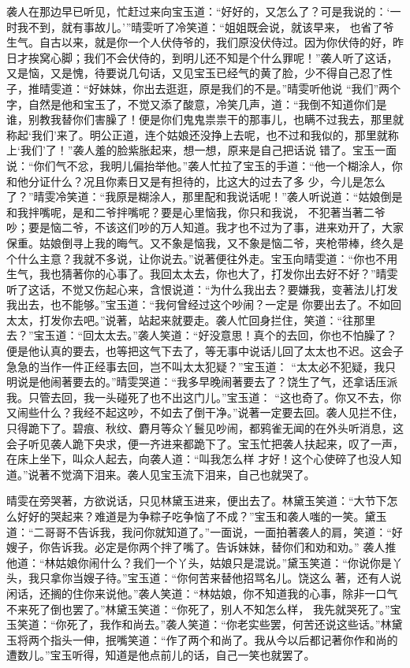 \begin{parag}


    袭人在那边早已听见，忙赶过来向宝玉道：“好好的，又怎么了？可是我说的：‘一时我不到，就有事故儿。’”晴雯听了冷笑道：“姐姐既会说，就该早来， 也省了爷生气。自古以来，就是你一个人伏侍爷的，我们原没伏侍过。因为你伏侍的好，昨日才挨窝心脚；我们不会伏侍的，到明儿还不知是个什么罪呢！”袭人听了这话，又是恼，又是愧，待要说几句话，又见宝玉已经气的黄了脸，少不得自己忍了性子，推晴雯道：“好妹妹，你出去逛逛，原是我们的不是。”晴雯听他说 “我们”两个字，自然是他和宝玉了，不觉又添了酸意，冷笑几声，道：“我倒不知道你们是谁，别教我替你们害臊了！便是你们鬼鬼祟祟干的那事儿，也瞒不过我去，那里就称起‘我们’来了。明公正道，连个姑娘还没挣上去呢，也不过和我似的，那里就称上‘我们’了！”袭人羞的脸紫胀起来，想一想，原来是自己把话说 错了。宝玉一面说：“你们气不忿，我明儿偏抬举他。”袭人忙拉了宝玉的手道：“他一个糊涂人，你和他分证什么？况且你素日又是有担待的，比这大的过去了多 少，今儿是怎么了？”晴雯冷笑道：“我原是糊涂人，那里配和我说话呢！”袭人听说道：“姑娘倒是和我拌嘴呢，是和二爷拌嘴呢？要是心里恼我，你只和我说， 不犯著当著二爷吵；要是恼二爷，不该这们吵的万人知道。我才也不过为了事，进来劝开了，大家保重。姑娘倒寻上我的晦气。又不象是恼我，又不象是恼二爷，夹枪带棒，终久是个什么主意？我就不多说，让你说去。”说著便往外走。宝玉向晴雯道：“你也不用生气，我也猜著你的心事了。我回太太去，你也大了，打发你出去好不好？”晴雯听了这话，不觉又伤起心来，含恨说道：“为什么我出去？要嫌我，变著法儿打发我出去，也不能够。”宝玉道：“我何曾经过这个吵闹？一定是 你要出去了。不如回太太，打发你去吧。”说著，站起来就要走。袭人忙回身拦住，笑道：“往那里去？”宝玉道：“回太太去。”袭人笑道：“好没意思！真个的去回，你也不怕臊了？便是他认真的要去，也等把这气下去了，等无事中说话儿回了太太也不迟。这会子急急的当作一件正经事去回，岂不叫太太犯疑？”宝玉道： “太太必不犯疑，我只明说是他闹著要去的。”晴雯哭道：“我多早晚闹著要去了？饶生了气，还拿话压派我。只管去回，我一头碰死了也不出这门儿。”宝玉道： “这也奇了。你又不去，你又闹些什么？我经不起这吵，不如去了倒干净。”说著一定要去回。袭人见拦不住，只得跪下了。碧痕、秋纹、麝月等众丫鬟见吵闹，都鸦雀无闻的在外头听消息，这会子听见袭人跪下央求，便一齐进来都跪下了。宝玉忙把袭人扶起来，叹了一声，在床上坐下，叫众人起去，向袭人道：“叫我怎么样 才好！这个心使碎了也没人知道。”说著不觉滴下泪来。袭人见宝玉流下泪来，自己也就哭了。
\end{parag}


\begin{parag}


    晴雯在旁哭著，方欲说话，只见林黛玉进来，便出去了。林黛玉笑道：“大节下怎么好好的哭起来？难道是为争粽子吃争恼了不成？”宝玉和袭人嗤的一笑。黛玉道：“二哥哥不告诉我，我问你就知道了。”一面说，一面拍著袭人的肩，笑道：“好嫂子，你告诉我。必定是你两个拌了嘴了。告诉妹妹，替你们和劝和劝。” 袭人推他道：“林姑娘你闹什么？我们一个丫头，姑娘只是混说。”黛玉笑道：“你说你是丫头，我只拿你当嫂子待。”宝玉道：“你何苦来替他招骂名儿。饶这么 著，还有人说闲话，还搁的住你来说他。”袭人笑道：“林姑娘，你不知道我的心事，除非一口气不来死了倒也罢了。”林黛玉笑道：“你死了，别人不知怎么样， 我先就哭死了。”宝玉笑道：“你死了，我作和尚去。”袭人笑道：“你老实些罢，何苦还说这些话。”林黛玉将两个指头一伸，抿嘴笑道：“作了两个和尚了。我从今以后都记著你作和尚的遭数儿。”宝玉听得，知道是他点前儿的话，自己一笑也就罢了。
\end{parag}


